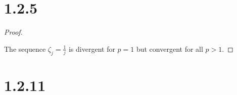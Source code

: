 \documentclass{article}
\begin{document}



\section*{1.2.5}

\begin{proof}
  $ $
  
  The sequence $\zeta_j = \frac{1}{j}$ is divergent for $p=1$ but convergent for all $p > 1$.

\end{proof}

\section*{1.2.11}
\end{document}
